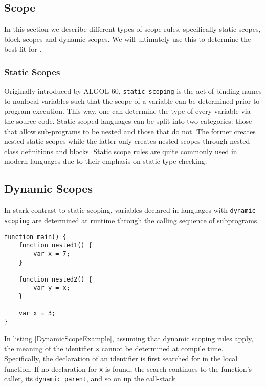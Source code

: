 \subsection{Scope}
In this section we describe different types of scope rules, specifically static scopes, block scopes and dynamic scopes.
We will ultimately use this to determine the best fit for \dazel{}.

\subsubsection{Static Scopes}
Originally introduced by ALGOL 60, \texttt{static scoping} is the act of binding names to nonlocal variables such that the scope of a variable
can be determined prior to program execution. This way, one can determine the type of every variable via the source code.
Static-scoped languages can be split into two categories: those that allow sub-programs to be nested and those that do not.
The former creates nested static scopes while the latter only creates nested scopes through nested class definitions and blocks. 
Static scope rules are quite commonly used in modern languages due to their emphasis on static type checking. \cite{sebesta_concepts_2016}

\subsection{Dynamic Scopes}
In stark contrast to static scoping, variables declared in languages with \texttt{dynamic scoping} are determined at runtime through the calling sequence of subprograms.

\begin{lstlisting}[caption={Example of dynamic scoping}, label={lst:DynamicScopeExample}]
function main() {
	function nested1() {
		var x = 7;
	}
	
	function nested2() {
		var y = x;
	}

	var x = 3;
}
\end{lstlisting}

In listing \ref{DynamicScopeExample}, assuming that dynamic scoping rules apply, the meaning of the identifier \texttt{x} cannot be determined at compile time.
Specifically, the declaration of an identifier is first searched for in the local function. 
If no declaration for \texttt{x} is found, the search continues to the function's caller, its \texttt{dynamic parent}, and so on up the call-stack.